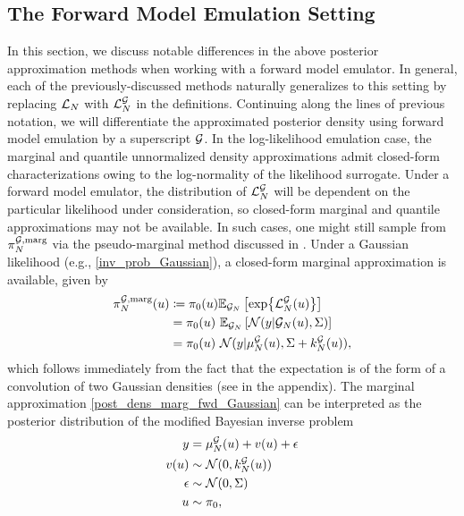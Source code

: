 \documentclass[12pt]{article}
\begin{document}
\subsection{The Forward Model Emulation Setting} \label{post_approx_fwd}
 In this section, we discuss notable differences in the above posterior approximation methods when working 
with a forward model emulator. In general, each of the previously-discussed methods naturally generalizes 
to this setting by replacing $\llikEm[\Ndesign]$ with $\llikEmFwd[\Ndesign]$ in the definitions. Continuing 
along the lines of previous notation, we will differentiate the approximated posterior density using forward 
model emulation by a superscript $\fwd$. In the log-likelihood emulation case, the marginal and quantile 
unnormalized density approximations admit closed-form characterizations 
owing to the log-normality of the likelihood surrogate. Under a forward model emulator, the distribution of 
$\llikEmFwd[\Ndesign]$ will be dependent on the particular likelihood under consideration, so closed-form 
marginal and quantile approximations may not be available. In such cases, one might still sample from 
$\fwdEmMargDens[\Ndesign]$ via the pseudo-marginal method discussed in .
Under a Gaussian likelihood (e.g., \ref{inv_prob_Gaussian}), a closed-form marginal approximation is
available, given by
\begin{align}
\fwdEmMargDens[\Ndesign](\Par) 
&\Def \priorDens(\Par) \E_{\fwdEm}\left[\Exp{\llikEmFwd[\Ndesign](\Par)} \right] \nonumber  \\
&= \priorDens(\Par) \ \E_{\fwdEm}\left[\Gaussian(\obs | \fwdEm[\Ndesign](\Par), \likPar) \right] \nonumber \\
&= \priorDens(\Par) \ \Gaussian(\obs | \emMean[\Ndesign]{\fwd}(\Par), \likPar + \emKer[\Ndesign]{\fwd}(\Par)), \label{post_dens_marg_fwd_Gaussian}
\end{align}
which follows immediately from the fact that the expectation is of the form of a convolution 
of two Gaussian densities (see  in the appendix).
The marginal approximation \ref{post_dens_marg_fwd_Gaussian}
can be interpreted as the posterior distribution of the modified Bayesian inverse problem 
\begin{align}
\obs &= \emMean[\Ndesign]{\fwd}(\Par) + v(\Par) + \noise \label{inv_prob_Gaussian_marginal_approx} \\
v(\Par) &\sim \Gaussian(0, \emKer[\Ndesign]{\fwd}(\Par)) \nonumber \\
\noise &\sim \Gaussian(0, \likPar) \nonumber \\
\Par &\sim \priorDens \nonumber, 
\end{align}
\end{document}
